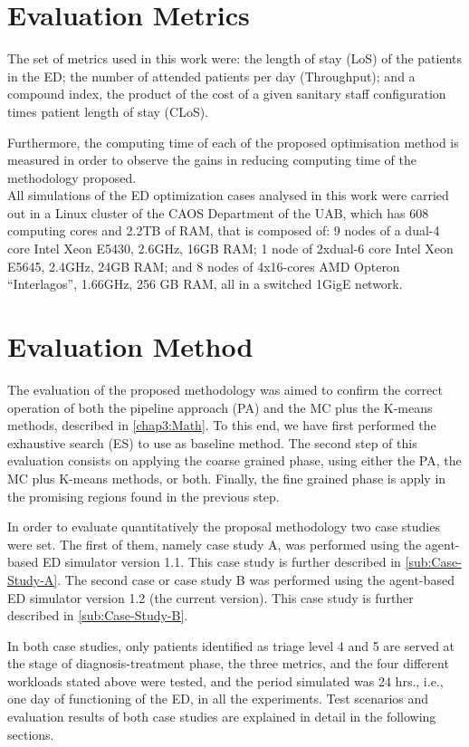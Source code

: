 \documentclass[11pt]{article} %
\begin{document}
\section{Evaluation Metrics}

The set of metrics used in this work were: the length of stay (LoS)
of the patients in the ED; the number of attended patients per day
(Throughput); and a compound index, the product of the cost of a given
sanitary staff configuration times patient length of stay (CLoS).

Furthermore, the computing time of each of the proposed optimisation
method is measured in order to observe the gains in reducing computing
time of the methodology proposed.\\


All simulations of the ED optimization cases analysed in this work
were carried out in a Linux cluster of the CAOS Department of the
UAB, which has 608 computing cores and 2.2TB of RAM, that is composed
of: 9 nodes of a dual-4 core Intel Xeon E5430, 2.6GHz, 16GB RAM; 1
node of 2xdual-6 core Intel Xeon E5645, 2.4GHz, 24GB RAM; and 8 nodes
of 4x16-cores AMD Opteron ``Interlagos'', 1.66GHz, 256 GB RAM, all
in a switched 1GigE network.


\section{Evaluation Method}

The evaluation of the proposed methodology was aimed to confirm the
correct operation of both the pipeline approach (PA) and the MC plus
the K-means methods, described in \ref{chap3:Math}. To this end,
we have first performed the exhaustive search (ES) to use as baseline
method. The second step of this evaluation consists on applying the
coarse grained phase, using either the PA, the MC plus K-means methods,
or both. Finally, the fine grained phase is apply in the promising
regions found in the previous step. 

In order to evaluate quantitatively the proposal methodology two case
studies were set. The first of them, namely case study A, was performed
using the agent-based ED simulator version 1.1. This case study is
further described in \ref{sub:Case-Study-A}. The second case or case
study B was performed using the agent-based ED simulator version 1.2
(the current version). This case study is further described in \ref{sub:Case-Study-B}.

In both case studies, only patients identified as triage level 4 and
5 are served at the stage of diagnosis-treatment phase, the three
metrics, and the four different workloads stated above were tested,
and the period simulated was 24 hrs., i.e., one day of functioning
of the ED, in all the experiments. Test scenarios and evaluation results
of both case studies are explained in detail in the following sections.\\
\end{document}
